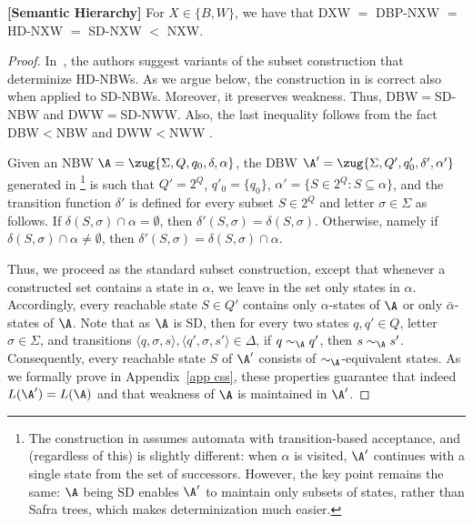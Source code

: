 \documentclass{lmcs}
\begin{document}
\begin{thm}{\bf [Semantic Hierarchy]} 
\label{sem hie}
	For $X \in \{B,W\}$, we have that {\rm DXW} $=$ {\rm DBP-NXW} $=$ {\rm HD-NXW} $=$ {\rm SD-NXW} $<$ {\rm NXW}.
\end{thm}

\begin{proof}
	In~\cite{KSV06,KS15}, the authors suggest variants of the subset construction that determinize HD-NBWs. 
	As we argue below, the construction in \cite{KS15} is correct also when applied to SD-NBWs. Moreover, it preserves weakness.  Thus, DBW$=$SD-NBW and DWW$=$SD-NWW. Also, the last inequality follows from the fact DBW$<$NBW and DWW$<$NWW \cite{Lan69}. 
	
	Given an NBW $\A = \zug{\Sigma, Q, q_0, \delta, \alpha}$, the DBW $\A' = \zug{\Sigma, Q', q'_0, \delta', \alpha'}$ generated in \cite{KS15}\footnote{The construction in \cite{KS15} assumes automata with transition-based acceptance, and (regardless of this) is slightly different: when $\alpha$ is visited, $\A'$ continues with a single state from the set of successors. However, the key point remains the same: $\A$ being SD enables $\A'$ to maintain only subsets of states, rather than Safra trees, which makes determinization much easier.} is such that $Q'=2^Q$, $q'_0= \{q_0\}$, $\alpha' = \{S\in 2^Q: S\subseteq \alpha\}$, and the transition function $\delta'$ is defined for every subset $S\in 2^Q$ and letter $\sigma\in \Sigma$ as follows. If $\delta(S, \sigma)\cap \alpha = \emptyset$, then $\delta'(S, \sigma)=\delta(S, \sigma)$. Otherwise, namely if $\delta(S, \sigma)\cap \alpha \neq \emptyset$, then $\delta'(S, \sigma)=\delta(S, \sigma) \cap \alpha$. 

Thus, we proceed as the standard subset construction, except that whenever a constructed set contains a state in $\alpha$, we leave in the set only states in $\alpha$. Accordingly, every reachable state $S\in Q'$ contains only $\alpha$-states of $\A$ or only $\bar{\alpha}$-states of $\A$. Note that as $\A$ is SD, then for every two states  $q,q' \in Q$, letter $\sigma\in \Sigma$, and transitions $\langle q, \sigma, s\rangle,\langle q', \sigma, s'\rangle \in \Delta$, if $q \sim_{\A} q'$, then $s \sim_{\A} s'$. Consequently, every reachable state $S$ of $\A'$ consists of $\sim_\A$-equivalent states. As we formally prove in Appendix~\ref{app css}, these properties guarantee that indeed $L(\A')=L(\A)$ and that weakness of $\A$ is maintained in $\A'$. 
\end{proof}
\end{document}

